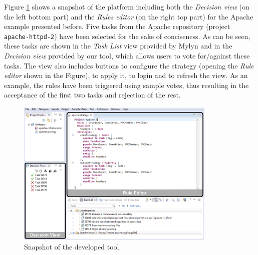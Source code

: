 Figure \ref{fig:snapshot} shows a snapshot of the platform including both the \emph{Decision view} (on the left bottom part) and the \emph{Rules editor} (on the right top part) for the Apache example presented before. Five tasks from the Apache repository (project \texttt{apache-httpd-2}) have been selected for the sake of conciseness. As can be seen, these tasks are shown in the \emph{Task List} view provided by Mylyn and in the \emph{Decision view} provided by our tool, which allows users to vote for/against these tasks. The view also includes buttons to configure the strategy (opening the \emph{Rule editor} shown in the Figure), to apply it, to login and to refresh the view. As an example, the rules have been triggered using sample votes, thus resulting in the acceptance of the first two tasks and rejection of the rest. 

\begin{figure}[t] 
  \centering
  \includegraphics[width=0.85\textwidth]{./figures/snapshot}
  \caption{Snapshot of the developed tool.}
  \label{fig:snapshot}
\end{figure}

